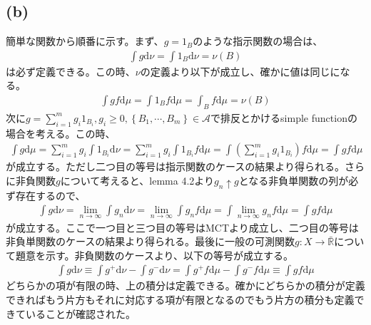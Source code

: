 \documentclass{article}
\begin{document}
\subsection{(b)}
簡単な関数から順番に示す。まず、$g = 1_B$のような指示関数の場合は、
\begin{align*}
	\int g \mathrm{d}\nu = \int 1_B \mathrm{d}\nu = \nu (B)
\end{align*}
は必ず定義できる。この時、$\nu$の定義より以下が成立し、確かに値は同じになる。
\begin{align*}
	\int gf \mathrm{d}\mu = \int 1_B f \mathrm{d}\mu = \int_B f \mathrm{d}\mu = \nu (B)
\end{align*}
次に$g = \sum_{i = 1}^m g_i 1_{B_i}, g_i \geq 0, \left\{B_1, \cdots, B_m\right\} \in \mathcal{A}$で排反とかけるsimple functionの場合を考える。この時、
\begin{align*}
	\int g \mathrm{d}\mu =\sum_{i = 1}^m g_i \int 1_{B_i} \mathrm{d}\nu = \sum_{i = 1}^m g_i \int 1_{B_i} f \mathrm{d}\mu = \int \left( \sum_{i = 1}^m g_i 1_{B_i} \right) f \mathrm{d}\mu = \int gf \mathrm{d}\mu
\end{align*}
が成立する。ただし二つ目の等号は指示関数のケースの結果より得られる。さらに非負関数$g$について考えると、lemma 4.2より$g_n \uparrow g$となる非負単関数の列が必ず存在するので、
\begin{align*}
	\int g \mathrm{d}\nu = \lim_{n \to \infty} \int g_n \mathrm{d}\nu =\lim_{n \to \infty} \int g_n f \mathrm{d}\mu = \int \lim_{n \to \infty}  g_n f \mathrm{d}\mu = \int gf \mathrm{d}\mu
\end{align*}
が成立する。ここで一つ目と三つ目の等号はMCTより成立し、二つ目の等号は非負単関数のケースの結果より得られる。最後に一般の可測関数$g : X \to \bar{\mathbb{R}}$について題意を示す。非負関数のケースより、以下の等号が成立する。
\begin{align*}
	\int g \mathrm{d}\nu \equiv \int g^{+} \mathrm{d}\nu - \int g^{-} \mathrm{d}\nu = \int g^{+} f \mathrm{d}\mu - \int g^{-} f \mathrm{d}\mu \equiv \int gf \mathrm{d}\mu
\end{align*}
どちらかの項が有限の時、上の積分は定義できる。確かにどちらかの積分が定義できればもう片方もそれに対応する項が有限となるのでもう片方の積分も定義できていることが確認された。
\end{document}
